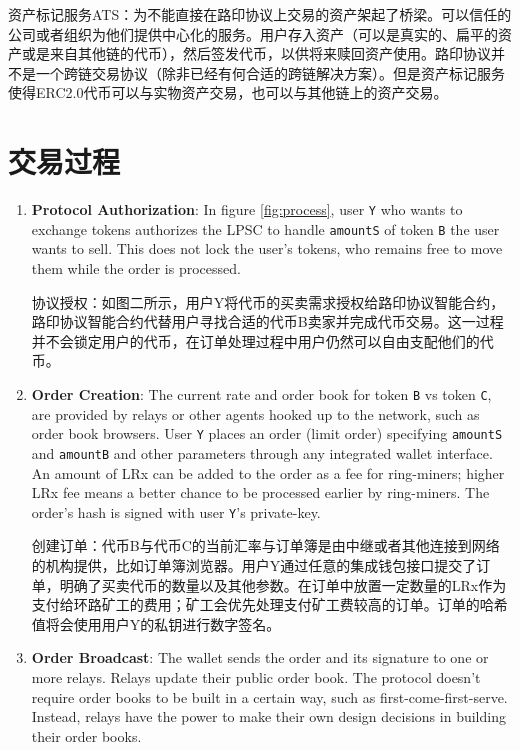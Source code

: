 \documentclass[UTF8,nofonts]{ctexart}
\begin{document}
\begin{multicols}{2}
\begin{itemize}
资产标记服务ATS：为不能直接在路印协议上交易的资产架起了桥梁。可以信任的公司或者组织为他们提供中心化的服务。用户存入资产（可以是真实的、扁平的资产或是来自其他链的代币），然后签发代币，以供将来赎回资产使用。路印协议并不是一个跨链交易协议（除非已经有何合适的跨链解决方案）。但是资产标记服务使得ERC2.0代币可以与实物资产交易，也可以与其他链上的资产交易。


\end{itemize}


\section{交易过程\label{sec:process}}



\begin{enumerate} 


\item \textbf{Protocol Authorization}: In figure \ref{fig:process}, user \verb|Y| who wants to exchange tokens authorizes the LPSC to handle \verb|amountS| of token \verb|B| the user wants to sell. This does not lock the user's tokens, who remains free to move them while the order is processed.

协议授权：如图二所示，用户Y将代币的买卖需求授权给路印协议智能合约，路印协议智能合约代替用户寻找合适的代币B卖家并完成代币交易。这一过程并不会锁定用户的代币，在订单处理过程中用户仍然可以自由支配他们的代币。


\item \textbf{Order Creation}: The current rate and order book for token \verb|B| vs token \verb|C|, are provided by relays or other agents hooked up to the network, such as order book browsers. User \verb|Y| places an order (limit order) specifying \verb|amountS| and \verb|amountB| and other parameters through any integrated wallet interface. An amount of LRx can be added to the order as a fee for ring-miners; higher LRx fee means a better chance to be processed earlier by ring-miners. The order's hash is signed with user \verb|Y|'s private-key.

创建订单：代币B与代币C的当前汇率与订单簿是由中继或者其他连接到网络的机构提供，比如订单簿浏览器。用户Y通过任意的集成钱包接口提交了订单，明确了买卖代币的数量以及其他参数。在订单中放置一定数量的LRx作为支付给环路矿工的费用；矿工会优先处理支付矿工费较高的订单。订单的哈希值将会使用用户Y的私钥进行数字签名。


\item \textbf{Order Broadcast}: The wallet sends the order and its signature to one or more relays. Relays update their public order book. The protocol doesn't require order books to be built in a certain way, such as first-come-first-serve. Instead, relays have the power to make their own design decisions in building their order books.


\end{enumerate}
\end{multicols}
\end{document}
